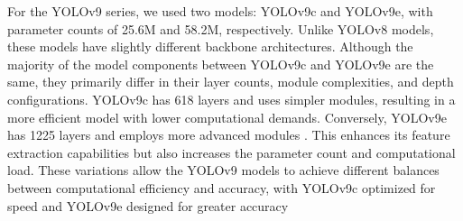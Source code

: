For the YOLOv9 series, we used two models: YOLOv9c and YOLOv9e, with parameter counts of 25.6M and 58.2M, respectively. Unlike YOLOv8 models, these models have slightly different backbone architectures. Although the majority of the model components between YOLOv9c and YOLOv9e are the same, they primarily differ in their layer counts, module complexities, and depth configurations. YOLOv9c has 618 layers and uses simpler modules, resulting in a more efficient model with lower computational demands. Conversely, YOLOv9e has 1225 layers and employs more advanced modules \cite{v9yaml}. This enhances its feature extraction capabilities but also increases the parameter count and computational load. These variations allow the YOLOv9 models to achieve different balances between computational efficiency and accuracy, with YOLOv9c optimized for speed and YOLOv9e designed for greater accuracy




